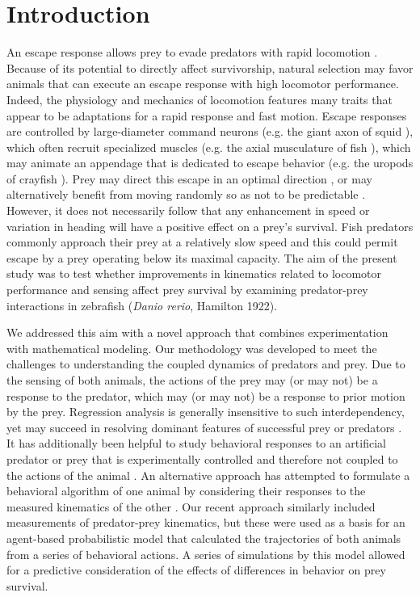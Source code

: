 \documentclass[]{rsos}%
\begin{document}
\section{Introduction}
An escape response allows prey to evade predators with rapid locomotion \cite{Bullock:1984gd}.
Because of its potential to directly affect survivorship, natural selection may favor animals that can execute an escape response with high locomotor performance.
Indeed, the physiology and mechanics of locomotion features many traits that appear to be adaptations for a rapid response and fast motion.
Escape responses are controlled by large-diameter command neurons (e.g. the giant axon of squid \cite{YOUNG:1938vi}), which often recruit specialized muscles (e.g. the axial musculature of fish \cite{Eaton:1975ux}), which may animate an appendage that is dedicated to escape behavior (e.g. the uropods of crayfish \cite{Johnson:1926cl}).
Prey may direct this escape in an optimal direction \cite{Weihs:1984tb}, or may alternatively benefit from moving randomly so as not to be predictable \cite{Humphries:1970hy,Howland:1974ud}.
However, it does not necessarily follow that any enhancement in speed or variation in heading will have a positive effect on a prey's survival.
Fish predators commonly approach their prey at a relatively slow speed \cite{Webb:1984jz,Higham:2007go} and this could permit escape by a prey operating below its maximal capacity. 
The aim of the present study was to test whether improvements in kinematics related to locomotor performance and sensing affect prey survival by examining predator-prey interactions in zebrafish (\textit{Danio rerio}, Hamilton 1922).

We addressed this aim with a novel approach that combines experimentation with mathematical modeling.
Our methodology was developed to meet the challenges to understanding the coupled dynamics of predators and prey.
Due to the sensing of both animals, the actions of the prey may (or may not) be a response to the predator, which may (or may not) be a response to prior motion by the prey. 
Regression analysis is generally insensitive to such interdependency, yet may succeed in resolving dominant features of successful prey \cite{Walker:2005vn} or predators \cite{Wainwright:2001ufa}.
It has additionally been helpful to study behavioral responses to an artificial predator or prey that is experimentally controlled and therefore not coupled to the actions of the animal \cite{Gabbiani:1999wz,Stewart:2014cma,Heuch:2007kk,Wainwright:2001ufa,Shifferman:2004fs}.
An alternative approach has attempted to formulate a behavioral algorithm of one animal by considering their responses to the measured kinematics of the other \cite{Ghose:2006dk}. 
Our recent approach similarly included measurements of predator-prey kinematics, but these were used as a basis for an agent-based probabilistic model that calculated the trajectories of both animals from a series of behavioral actions. 
A series of simulations by this model allowed for a predictive consideration of the effects of differences in behavior on prey survival.
\end{document}
